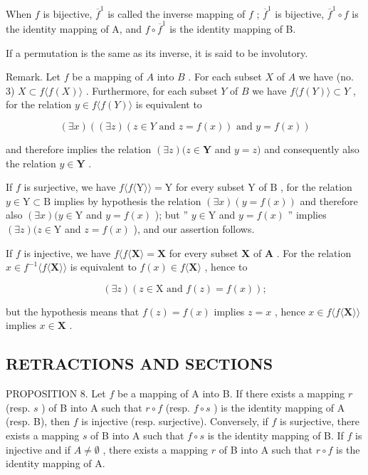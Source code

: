 When \(f\) is bijective, \(\overline{f}^1\) is called the inverse mapping of \(f\) ; \(\overline{f}^1\) is bijective, \(\overline{f}^1 \circ f\) is the identity mapping of A, and \(f \circ \overline{f}^1\) is the identity mapping of B.

If a permutation is the same as its inverse, it is said to be involutory.

Remark. Let \(f\) be a mapping of \(A\) into \(B\) . For each subset \(X\) of \(A\) we have (no. 3) \(X \subset f\langle f(X)\rangle\) . Furthermore, for each subset \(Y\) of \(B\) we have \(f\langle f(Y)\rangle \subset Y\) , for the relation \(y \in f\langle f(Y)\rangle\) is equivalent to

\[
(\exists x) ((\exists z) (z \in Y \text { and } z = f (x)) \text { and } y = f (x))
\]

and therefore implies the relation \((\exists z)(z \in \mathbf{Y}\) and \(y = z)\) and consequently also the relation \(y \in \mathbf{Y}\) .

If \(f\) is surjective, we have \(f\langle f\langle \mathrm{Y}\rangle\rangle = \mathrm{Y}\) for every subset \(\mathrm{Y}\) of \(\mathrm{B}\) , for the relation \(y\in \mathrm{Y}\subset \mathrm{B}\) implies by hypothesis the relation \((\exists x)(y = f(x))\) and therefore also \((\exists x)(y\in \mathrm{Y}\) and \(y = f(x)\) ); but '' \(y\in \mathrm{Y}\) and \(y = f(x)\) '' implies \((\exists z)(z\in \mathrm{Y}\) and \(z = f(x)\) ), and our assertion follows.

If \(f\) is injective, we have \(f\langle f\langle \mathbf{X}\rangle = \mathbf{X}\) for every subset \(\mathbf{X}\) of \(\mathbf{A}\) . For the relation \(x\in f^{-1}\langle f\langle \mathbf{X}\rangle\rangle\) is equivalent to \(f(x)\in f\langle \mathbf{X}\rangle\) , hence to

\[
(\exists z) (z \in \mathrm{X} \text {   and   } f (z) = f (x));
\]

but the hypothesis means that \(f(z) = f(x)\) implies \(z = x\) , hence \(x \in f\langle f\langle \mathbf{X}\rangle \rangle\) implies \(x \in \mathbf{X}\) .

\subsection{RETRACTIONS AND SECTIONS}

PROPOSITION 8. Let \(f\) be a mapping of A into B. If there exists a mapping \(r\) (resp. \(s\) ) of B into A such that \(r \circ f\) (resp. \(f \circ s\) ) is the identity mapping of A (resp. B), then \(f\) is injective (resp. surjective). Conversely, if \(f\) is surjective, there exists a mapping \(s\) of B into A such that \(f \circ s\) is the identity mapping of B. If \(f\) is injective and if \(A \neq \emptyset\) , there exists a mapping \(r\) of B into A such that \(r \circ f\) is the identity mapping of A.

